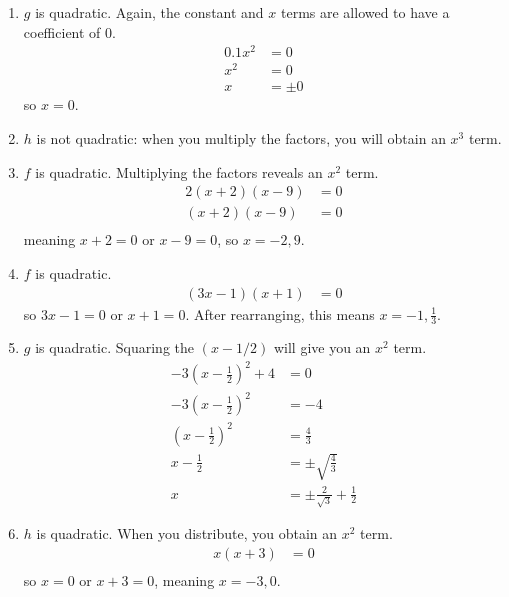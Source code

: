 \documentclass[noauthor]{ximera}
\begin{document}
\begin{problem}
\begin{explanation}
\begin{enumerate}
    \item \(g\) is quadratic. Again, the constant and \(x\) terms are allowed to have a coefficient of 0.
    \begin{align*}
        0.1x^2 & = 0 \\
        x^2 & = 0 \\
        x & = \pm 0
    \end{align*}
    so \(x = 0\).

    \item \(h\) is not quadratic: when you multiply the factors, you will obtain an \(x^3\) term.
    
    \item \(f\) is quadratic. Multiplying the factors reveals an \(x^2\) term.
    \begin{align*}
        2\left(x+2\right)\left(x-9\right) & = 0 \\
        (x + 2)(x - 9) & = 0 \\
    \end{align*}
    meaning \(x + 2 = 0\) or \(x - 9 = 0\), so \(x = -2, 9\).

    \item \(f\) is quadratic.
    \begin{align*}
        \left(3x-1\right)\left(x+1\right) & = 0
    \end{align*}
    so \(3x - 1 = 0\) or \(x + 1 = 0\). After rearranging, this means \(x = -1, \frac{1}{3}\).

    \item \(g\) is quadratic. Squaring the \((x - 1/2)\) will give you an \(x^2\) term.
    \begin{align*}
        -3\left(x-\frac{1}{2}\right)^2+4 & = 0 \\
        -3\left(x-\frac{1}{2}\right)^2 & = -4 \\
        \left(x-\frac{1}{2}\right)^2 & = \frac{4}{3} \\
        x - \frac{1}{2} & = \pm \sqrt{\frac{4}{3}} \\
        x & = \pm \frac{2}{\sqrt{3}} + \frac{1}{2}
    \end{align*}

    \item \(h\) is quadratic. When you distribute, you obtain an \(x^2\) term.
    \begin{align*}
        x\left(x+3\right) & = 0 \\
    \end{align*}
    so \(x = 0\) or \(x + 3 = 0\), meaning \(x = -3, 0\).


\end{enumerate}
\end{explanation}
\end{problem}
\end{document}
